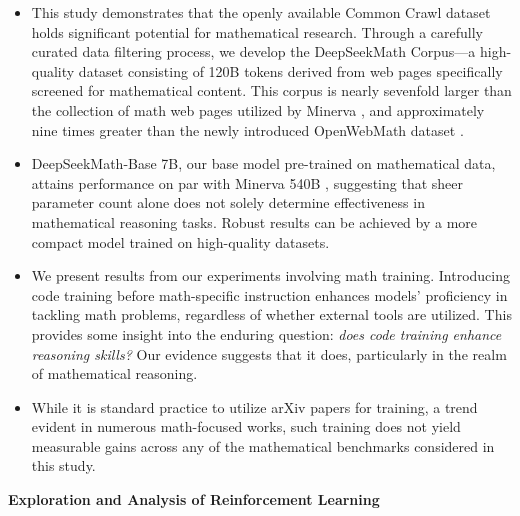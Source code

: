 \begin{itemize}[topsep=0pt]
    \item This study demonstrates that the openly available Common Crawl dataset holds significant potential for mathematical research. Through a carefully curated data filtering process, we develop the DeepSeekMath Corpus—a high-quality dataset consisting of 120B tokens derived from web pages specifically screened for mathematical content. This corpus is nearly sevenfold larger than the collection of math web pages utilized by Minerva \citep{minerva}, and approximately nine times greater than the newly introduced OpenWebMath dataset \citep{openwebmath}.

\item DeepSeekMath-Base 7B, our base model pre-trained on mathematical data, attains performance on par with Minerva 540B \citep{minerva}, suggesting that sheer parameter count alone does not solely determine effectiveness in mathematical reasoning tasks. Robust results can be achieved by a more compact model trained on high-quality datasets.

\item We present results from our experiments involving math training. Introducing code training before math-specific instruction enhances models’ proficiency in tackling math problems, regardless of whether external tools are utilized. This provides some insight into the enduring question: \textit{does code training enhance reasoning skills?} Our evidence suggests that it does, particularly in the realm of mathematical reasoning.

\item While it is standard practice to utilize arXiv papers for training, a trend evident in numerous math-focused works, such training does not yield measurable gains across any of the mathematical benchmarks considered in this study.
\end{itemize}

\textbf{Exploration and Analysis of Reinforcement Learning}

